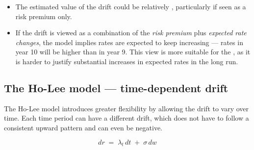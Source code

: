 \begin{mrtrapbox}[title={Limitation of a constant drift}]
\begin{itemize}
\item The estimated value of the drift could be relatively , particularly if seen as
      a risk premium only.
\item If the drift is viewed as a combination of the \textit{risk premium} plus \textit{expected
      rate changes}, the model implies rates are expected to keep increasing --- rates in year 10
      will be higher than in year 9. This view is more suitable for the , as it
      is harder to justify substantial increases in expected rates in the long run.
\end{itemize}
\end{mrtrapbox}

\subsection{The Ho-Lee model --- time-dependent drift}
The Ho-Lee model introduces greater flexibility by allowing the drift to vary over time. Each
time period can have a different drift, which does not have to follow a consistent upward
pattern and can even be negative.

\begin{mrfmlbox}
\[ dr \;=\; \lambda_t\, dt \;+\; \sigma\, dw \]
\end{mrfmlbox}

\begin{center}
\end{center}

